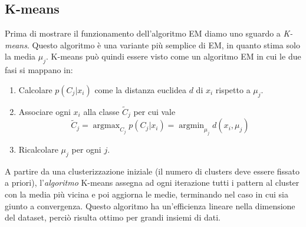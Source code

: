 \documentclass[a4paper,oneside,titlepage]{book}
\DeclareMathOperator*{\argmax}{\arg\max}
\DeclareMathOperator*{\argmin}{\arg\min}
\begin{document}
\subsection{K-means}
\label{K-means}
Prima di mostrare il funzionamento dell'algoritmo EM diamo uno sguardo a \textit{K-means}. Questo algoritmo è una variante più semplice di EM, in quanto stima solo la media $\mu_j$.
\newpage
\noindent
K-means può quindi essere visto come un algoritmo EM in cui le due fasi si mappano in:
\begin{enumerate}
    \item Calcolare $p(C_j|x_i)$ come la distanza euclidea $d$ di $x_i$ rispetto a $\mu_j$.
    \item Associare ogni $x_i$ alla classe $\tilde{C}_j$ per cui vale
    \[ \tilde{C}_j = \argmax_{C_j} p(C_j|x_i) = \argmin_{\mu_j} d(x_i,\mu_j) \]
    \item Ricalcolare $\mu_j$ per ogni $j$.
\end{enumerate}
A partire da una clusterizzazione iniziale (il numero di clusters deve essere fissato a priori), l'\textit{algoritmo} K-means assegna ad ogni iterazione tutti i pattern al cluster con la media più vicina e poi aggiorna le medie, terminando nel caso in cui sia giunto a convergenza. Questo algoritmo ha un'efficienza lineare nella dimensione del dataset, perciò risulta ottimo per grandi insiemi di dati.
\end{document}
